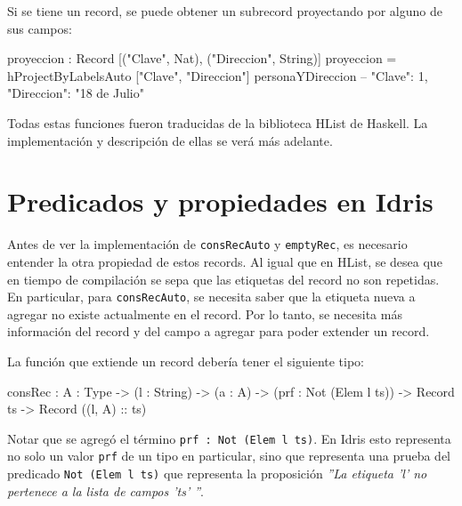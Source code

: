
Si se tiene un record, se puede obtener un subrecord proyectando por alguno de sus campos:

\begin{code}
proyeccion : Record [("Clave", Nat), ("Direccion", String)]
proyeccion = hProjectByLabelsAuto ["Clave", "Direccion"]
  personaYDireccion
-- { "Clave": 1, "Direccion": "18 de Julio" }
\end{code}

Todas estas funciones fueron traducidas de la biblioteca HList de Haskell. La implementación y descripción de ellas se verá más adelante.

\section{Predicados y propiedades en Idris}

Antes de ver la implementación de \texttt{consRecAuto} y \texttt{emptyRec}, es necesario entender la otra propiedad de estos records. Al igual que en HList, se desea que en tiempo de compilación se sepa que las etiquetas del record no son repetidas. En particular, para \texttt{consRecAuto}, se necesita saber que la etiqueta nueva a agregar no existe actualmente en el record. Por lo tanto, se necesita más información del record y del campo a agregar para poder extender un record.

La función que extiende un record debería tener el siguiente tipo:

\begin{code}
consRec : {A : Type} -> (l : String) -> (a : A) ->
  (prf : Not (Elem l ts)) -> Record ts -> Record ((l, A) :: ts)
\end{code}

Notar que se agregó el término \texttt{prf : Not (Elem l ts)}. En Idris esto representa no solo un valor \texttt{prf} de un tipo en particular, sino que representa una prueba del predicado \texttt{Not (Elem l ts)} que representa la proposición \textit{''La etiqueta 'l' no pertenece a la lista de campos 'ts' ''}.

